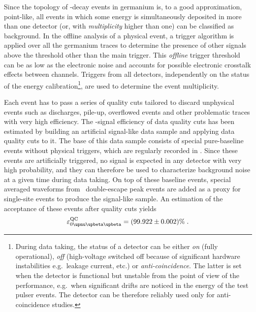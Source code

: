 Since the topology of \onbb-decay events in germanium is, to a good approximation,
point-like, all events in which some energy is simultaneously deposited in more than one
detector (or, with \emph{multiplicity} higher than one) can be classified as background. In the
offline analysis of a physical event, a trigger algorithm is applied over all the
germanium traces to determine the presence of other signals above the threshold other than
the main trigger. This \emph{offline} trigger threshold can be as low as the electronic noise
and accounts for possible electronic crosstalk effects between channels. Triggers from all
detectors, independently on the status of the energy calibration\footnote{%
  During data taking, the status of a detector can be either \emph{on} (fully
  operational), \emph{off} (high-voltage switched off because of significant hardware
  instabilities e.g.~leakage current, etc.) or \emph{anti-coincidence}. The latter is set
  when the detector is functional but unstable from the point of view of the performance,
  e.g.~when significant drifts are noticed in the energy of the test pulser events. The
  detector can be therefore reliably used only for anti-coincidence studies.
}, are used to determine the event multiplicity.

Each event has to pass a series of quality cuts tailored to discard unphysical events such
as discharges, pile-up, overflowed events and other problematic traces with very high
efficiency. The \onbb-signal efficiency of data quality cuts has been estimated by
building an artificial signal-like data sample and applying data quality cuts to it.  The
base of this data sample consists of special pure-baseline events without physical
triggers, which are regularly recorded in \gerda. Since these events are artificially
triggered, no signal is expected in any detector with very high probability, and they can
therefore be used to characterize background noise at a given time during data taking.  On
top of these baseline events, special averaged waveforms from \Th\ double-escape peak
events are added as a proxy for single-site events to produce the signal-like sample. An
estimation of the acceptance of these events after quality cuts yields
\[
  \epsilon_\onbbM^\text{QC} = (99.922 \pm 0.002)\% \;.
\]


